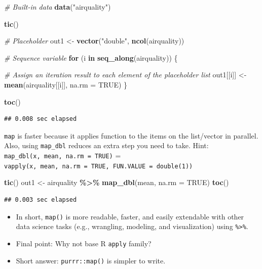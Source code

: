 \documentclass[
]{book}
\newenvironment{Shaded}{\begin{snugshade}}{\end{snugshade}}
\newcommand{\AttributeTok}[1]{\textcolor[rgb]{0.13,0.29,0.53}{#1}}
\newcommand{\CommentTok}[1]{\textcolor[rgb]{0.56,0.35,0.01}{\textit{#1}}}
\newcommand{\ConstantTok}[1]{\textcolor[rgb]{0.56,0.35,0.01}{#1}}
\newcommand{\ControlFlowTok}[1]{\textcolor[rgb]{0.13,0.29,0.53}{\textbf{#1}}}
\newcommand{\FunctionTok}[1]{\textcolor[rgb]{0.13,0.29,0.53}{\textbf{#1}}}
\newcommand{\NormalTok}[1]{#1}
\newcommand{\OtherTok}[1]{\textcolor[rgb]{0.56,0.35,0.01}{#1}}
\newcommand{\SpecialCharTok}[1]{\textcolor[rgb]{0.81,0.36,0.00}{\textbf{#1}}}
\newcommand{\StringTok}[1]{\textcolor[rgb]{0.31,0.60,0.02}{#1}}
\begin{document}
\begin{Shaded}
\begin{Highlighting}[]
\CommentTok{\# Built{-}in data}
\FunctionTok{data}\NormalTok{(}\StringTok{"airquality"}\NormalTok{)}

\FunctionTok{tic}\NormalTok{()}

\CommentTok{\# Placeholder}
\NormalTok{out1 }\OtherTok{\textless{}{-}} \FunctionTok{vector}\NormalTok{(}\StringTok{"double"}\NormalTok{, }\FunctionTok{ncol}\NormalTok{(airquality))}

\CommentTok{\# Sequence variable}
\ControlFlowTok{for}\NormalTok{ (i }\ControlFlowTok{in} \FunctionTok{seq\_along}\NormalTok{(airquality)) \{ }

  \CommentTok{\# Assign an iteration result to each element of the placeholder list }
\NormalTok{  out1[[i]] }\OtherTok{\textless{}{-}} \FunctionTok{mean}\NormalTok{(airquality[[i]], }\AttributeTok{na.rm =} \ConstantTok{TRUE}\NormalTok{)}
\NormalTok{\}}

\FunctionTok{toc}\NormalTok{()}
\end{Highlighting}
\end{Shaded}

\begin{verbatim}
## 0.008 sec elapsed
\end{verbatim}

\texttt{map} is faster because it applies function to the items on the list/vector in parallel. Also, using \texttt{map\_dbl} reduces an extra step you need to take. Hint: \texttt{map\_dbl(x,\ mean,\ na.rm\ =\ TRUE)} = \texttt{vapply(x,\ mean,\ na.rm\ =\ TRUE,\ FUN.VALUE\ =\ double(1))}

\begin{Shaded}
\begin{Highlighting}[]
\FunctionTok{tic}\NormalTok{()}
\NormalTok{out1 }\OtherTok{\textless{}{-}}\NormalTok{ airquality }\SpecialCharTok{\%\textgreater{}\%} \FunctionTok{map\_dbl}\NormalTok{(mean, }\AttributeTok{na.rm =} \ConstantTok{TRUE}\NormalTok{)}
\FunctionTok{toc}\NormalTok{()}
\end{Highlighting}
\end{Shaded}

\begin{verbatim}
## 0.003 sec elapsed
\end{verbatim}

\begin{itemize}
\item
  In short, \texttt{map()} is more readable, faster, and easily extendable with other data science tasks (e.g., wrangling, modeling, and visualization) using \texttt{\%\textgreater{}\%}.
\item
  Final point: Why not base R \texttt{apply} family?
\item
  Short answer: \texttt{purrr::map()} is simpler to write.
\end{itemize}
\end{document}
